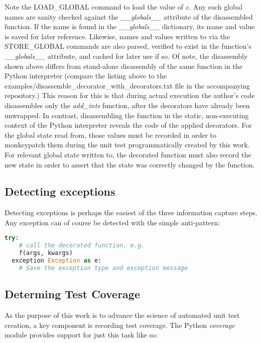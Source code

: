 

Note the LOAD\_GLOBAL command to load the value of \textit{c}.  Any such global names 
are sanity checked against the \textit{\_\_globals\_\_} attribute of the 
disassembled function.
%
If the name is found in the \textit{\_\_globals\_\_} dictionary, its name and 
value is saved for later reference.  Likewise, names and values written to via 
the STORE\_GLOBAL commands are also parsed, verified to exist in the function's
 \textit{\_\_globals\_\_} attribute, and cached for later use if so.
%
Of note, the disassembly shown above differs from stand-alone disassembly of 
the same function in the Python interpreter (compare the listing above to the
 examples/disassemble\_decorator\_with\_decorators.txt file in the 
 accompanying repository.)
This reason for this is that during actual execution the author's code
 disassembles only the \textit{add\_ints} function, after the decorators
  have already been unwrapped.
In contrast, disassembling the function in the static, non-executing context of
the Python interpreter reveals the code of the applied decorators.  
%
For the global state read from, those values must be recorded 
in order to monkeypatch them during the unit test programmatically 
created by this work.
%
For relevant global state written to, the decorated function must also record
the new state in order to assert that the state was correctly changed by the function.

\subsection{Detecting exceptions}\label{sec:approach-internal-3}
Detecting exceptions is perhaps the easiest of the three information capture steps.
Any exception can of course be detected with the simple anti-pattern:

\begin{lstlisting}[language=Python, caption={Catching and recording exceptions}]
  try:
    # call the decorated function, e.g.
    f(args, kwargs)
  exception Exception as e:
    # Save the exception type and exception message
  \end{lstlisting}

\subsection{Determing Test Coverage}\label{sec:approach-internal-4}
As the purpose of this work is to advance the science of automated unit test 
creation, a key component is recording test coverage.  The Python \textit{coverage}
module provides support for just this task like so:

